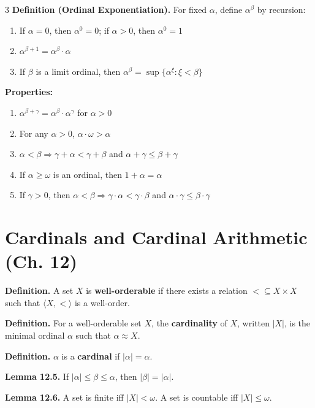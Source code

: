 \documentclass[landscape,8pt]{article}
\renewcommand{\implies}{\Rightarrow}
\begin{document}
\begin{multicols}{3}
	\noindent\textbf{Definition (Ordinal Exponentiation).} For fixed $\alpha$, define $\alpha^\beta$ by recursion:
	\begin{enumerate}[noitemsep,topsep=0pt]
		\item If $\alpha = 0$, then $\alpha^0 = 0$; if $\alpha > 0$, then $\alpha^0 = 1$
		\item $\alpha^{\beta+1} = \alpha^\beta \cdot \alpha$
		\item If $\beta$ is a limit ordinal, then $\alpha^\beta = \sup\{\alpha^\xi : \xi < \beta\}$
	\end{enumerate}

	\noindent\textbf{Properties:}
	\begin{enumerate}[noitemsep,topsep=0pt]
		\item $\alpha^{\beta+\gamma} = \alpha^\beta \cdot \alpha^\gamma$ for $\alpha > 0$
		\item For any $\alpha > 0$, $\alpha \cdot \omega > \alpha$
		\item $\alpha < \beta \implies \gamma + \alpha < \gamma + \beta$ and $\alpha + \gamma \leq \beta + \gamma$
		\item If $\alpha \geq \omega$ is an ordinal, then $1 + \alpha = \alpha$
		\item If $\gamma > 0$, then $\alpha < \beta \implies \gamma \cdot \alpha < \gamma \cdot \beta$ and $\alpha \cdot \gamma \leq \beta \cdot \gamma$
	\end{enumerate}

	\section*{\centering Cardinals and Cardinal Arithmetic (Ch. 12)}

	\noindent\textbf{Definition.} A set $X$ is \textbf{well-orderable} if there exists a relation $< \subseteq X \times X$ such that $\langle X, < \rangle$ is a well-order.

	\noindent\textbf{Definition.} For a well-orderable set $X$, the \textbf{cardinality} of $X$, written $|X|$, is the minimal ordinal $\alpha$ such that $\alpha \approx X$.

	\noindent\textbf{Definition.} $\alpha$ is a \textbf{cardinal} if $|\alpha| = \alpha$.

	\noindent\textbf{Lemma 12.5.} If $|\alpha| \leq \beta \leq \alpha$, then $|\beta| = |\alpha|$.

	\noindent\textbf{Lemma 12.6.} A set is finite iff $|X| < \omega$. A set is countable iff $|X| \leq \omega$.


\end{multicols}
\end{document}
